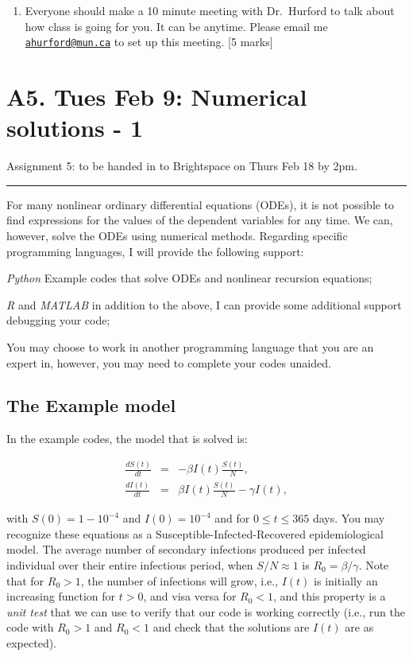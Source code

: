 \documentclass[]{book}
\providecommand{\tightlist}{%
  \setlength{\itemsep}{0pt}\setlength{\parskip}{0pt}}
\begin{document}
\begin{enumerate}
\def\labelenumi{\arabic{enumi}.}
\setcounter{enumi}{4}
\tightlist
\item
  Everyone should make a 10 minute meeting with Dr.~Hurford to talk
  about how class is going for you. It can be anytime. Please email me
  \href{mailto:ahurford@mun.ca}{\nolinkurl{ahurford@mun.ca}} to set up
  this meeting. {[}5 marks{]}
\end{enumerate}

\chapter{A5. Tues Feb 9: Numerical solutions -
1}\label{a5.-tues-feb-9-numerical-solutions---1}

Assignment 5: to be handed in to Brightspace on Thurs Feb 18 by 2pm.

\begin{center}\rule{0.5\linewidth}{0.5pt}\end{center}

For many nonlinear ordinary differential equations (ODEs), it is not
possible to find expressions for the values of the dependent variables
for any time. We can, however, solve the ODEs using numerical methods.
Regarding specific programming languages, I will provide the following
support:

\emph{Python} Example codes that solve ODEs and nonlinear recursion
equations;

\emph{R} and \emph{MATLAB} in addition to the above, I can provide some
additional support debugging your code;

You may choose to work in another programming language that you are an
expert in, however, you may need to complete your codes unaided.

\section{The Example model}\label{the-example-model}

In the example codes, the model that is solved is:

\begin{eqnarray}
\frac{dS(t)}{dt} & = & - \beta I(t)\frac{S(t)}{N},\\
\frac{dI(t)}{dt} & = & \beta I(t)\frac{S(t)}{N} - \gamma I(t),
\end{eqnarray}

with \(S(0) = 1 - 10^{-4}\) and \(I(0) = 10^{-4}\) and for
\(0 \leq t \leq 365\) days. You may recognize these equations as a
Susceptible-Infected-Recovered epidemiological model. The average number
of secondary infections produced per infected individual over their
entire infectious period, when \(S/N \approx 1\) is
\(R_0 = \beta/\gamma\). Note that for \(R_0 > 1\), the number of
infections will grow, i.e., \(I(t)\) is initially an increasing function
for \(t>0\), and visa versa for \(R_0 < 1\), and this property is a
\emph{unit test} that we can use to verify that our code is working
correctly (i.e., run the code with \(R_0 > 1\) and \(R_0 < 1\) and check
that the solutions are \(I(t)\) are as expected).
\end{document}
